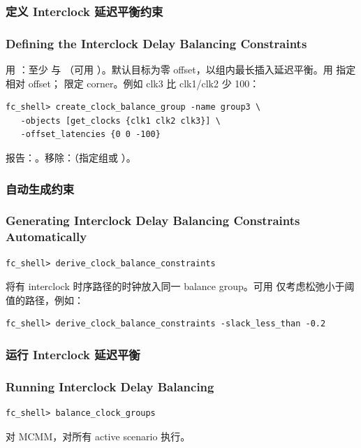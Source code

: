 \subsubsection{定义 Interclock 延迟平衡约束}
\subsubsection*{Defining the Interclock Delay Balancing Constraints}

用 ：至少  与 （可用 ）。默认目标为零 offset，以组内最长插入延迟平衡。用  指定相对 offset； 限定 corner。例如 clk3 比 clk1/clk2 少 100：
\begin{lstlisting}
fc_shell> create_clock_balance_group -name group3 \
   -objects [get_clocks {clk1 clk2 clk3}] \
   -offset_latencies {0 0 -100}
\end{lstlisting}
报告：。移除：（指定组或 ）。

\subsubsection{自动生成约束}
\subsubsection*{Generating Interclock Delay Balancing Constraints Automatically}

\begin{lstlisting}
fc_shell> derive_clock_balance_constraints
\end{lstlisting}
将有 interclock 时序路径的时钟放入同一 balance group。可用  仅考虑松弛小于阈值的路径，例如：
\begin{lstlisting}
fc_shell> derive_clock_balance_constraints -slack_less_than -0.2
\end{lstlisting}

\subsubsection{运行 Interclock 延迟平衡}
\subsubsection*{Running Interclock Delay Balancing}

\begin{lstlisting}
fc_shell> balance_clock_groups
\end{lstlisting}
对 MCMM，对所有 active scenario 执行。

